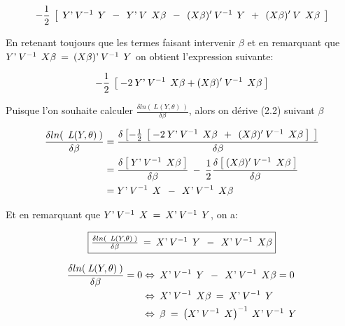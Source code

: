 \documentclass[12pt,fleqn]{book} %
\begin{document}
$$ -\frac{1}{2} \:\left[\:\: Y\textnormal{'}\:V^{-1}\:\: Y \:\:-\:\: Y\textnormal{'} \:V\:\: X\beta \:\:-\:\: (X\beta)'\:V^{-1}\:\: Y \:\:+\:\: (X\beta)' \:V\:\: X\beta \:\:\right]$$ 

\vspace{1em}

En retenant toujours que les termes faisant intervenir $\beta$ et en remarquant que\\ $Y\textnormal{'}\: V^{-1}\:\:X\beta \:=\: (X\beta)\textnormal{'}\:V^{-1}\:\: Y$ on obtient l'expression suivante:

\begin{equation}
-\frac{1}{2}  \:\left[\: -2\: Y\textnormal{'} \:V^{-1}\:\: X\beta + (X\beta)' \:V^{-1}\:\: X\beta \:\right]
\end{equation}

\vspace{1em}

Puisque l'on souhaite calculer $\frac{\delta ln(\:\textit{L}(Y,\theta)\:)}{\delta\beta}$, alors on dérive (2.2) suivant $\beta$

\begin{align*}
\frac{\delta ln(\:\:\textit{L}(Y,\theta)\:)}{\delta\beta} &= \frac{\delta \left[ -\frac{1}{2} \:\left[\: -2\: Y\textnormal{'} \:V^{-1}\:\: X\beta \:\:+\:\: (X\beta)' \:V^{-1}\:\: X\beta \:\right] \:\: \right] }{\delta\beta} \\
&=  \frac{  \delta \left[\:  Y\textnormal{'} \:V^{-1}\:\: X\beta \:\right] }{\delta\beta} \:-\: \frac{1}{2}  \frac{\delta \left[\:  (X\beta)' \:V^{-1} \:\: X\beta \:\right] }{\delta\beta}\\
&= Y\textnormal{'} \:V^{-1}\:\: X \:\:-\:\: X\textnormal{'} \:V^{-1}\:\: X\beta
\end{align*}

\vspace{1em}

Et en remarquant que \quad $Y\textnormal{'} \:V^{-1}\:\: X\:=\:X\textnormal{'} \:V^{-1}\:\: Y$, on a:

\begin{equation}
 \fbox{$
\frac{\delta ln(\:\:\textit{L}(Y,\theta)\:)}{\delta\beta} \:=\: X\textnormal{'} \:V^{-1}\:\: Y \:\:-\:\: X\textnormal{'} \:V^{-1}\:\: X\beta
$}
\end{equation}

\vspace{1em}

\begin{align*}
\frac{\delta ln(\:\textit{L}(Y,\theta)\:)}{\delta\beta}=0 &\Leftrightarrow \: X\textnormal{'} \:V^{-1}\:\: Y \:\:-\:\:  X\textnormal{'} \:V^{-1}\:\: X\beta = 0 \\
& \Leftrightarrow \:   X\textnormal{'} \:V^{-1}\:\: X\beta \:=\:  X\textnormal{'} \:V^{-1}\:\: Y\\
& \Leftrightarrow \: \beta \: = \: \left(  X\textnormal{'}\:V^{-1}\:\: X \right)^{-1}  \: X\textnormal{'} \:V^{-1}\:\: Y
\end{align*}
\end{document}
